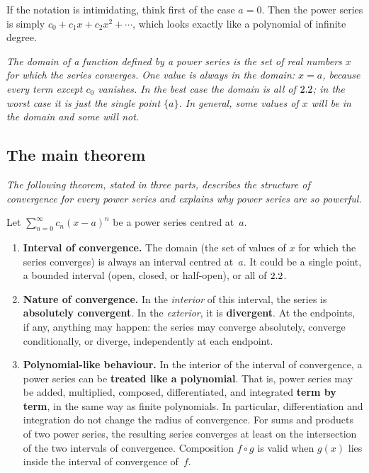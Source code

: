 \begin{remark}
If the notation is intimidating, think first of the case $a=0$.  Then the power series is simply $c_{0}+c_{1}x+c_{2}x^{2}+\cdots$, which looks exactly like a polynomial of infinite degree.
\end{remark}

\textit{The domain of a function defined by a power series is the set of real numbers $x$ for which the series converges.  One value is always in the domain: $x=a$, because every term except $c_{0}$ vanishes.  In the best case the domain is all of $2.2$; in the worst case it is just the single point $\{a\}$.  In general, some values of $x$ will be in the domain and some will not.}

\subsection*{The main theorem}

\textit{The following theorem, stated in three parts, describes the structure of convergence for every power series and explains why power series are so powerful.}

\begin{theorem}
\label{thm:14-1}
Let $\sum_{n=0}^{\infty}c_{n}(x-a)^{n}$ be a power series centred at~$a$.

\begin{enumerate}[label=(\roman*)]
  \item \textbf{Interval of convergence.}  The domain (the set of values of $x$ for which the series converges) is always an interval centred at~$a$.  It could be a single point, a bounded interval (open, closed, or half-open), or all of $2.2$.

  \item \textbf{Nature of convergence.}  In the \emph{interior} of this interval, the series is \textbf{absolutely convergent}.  In the \emph{exterior}, it is \textbf{divergent}.  At the endpoints, if any, anything may happen: the series may converge absolutely, converge conditionally, or diverge, independently at each endpoint.

  \item \textbf{Polynomial-like behaviour.}  In the interior of the interval of convergence, a power series can be \textbf{treated like a polynomial}.  That is, power series may be added, multiplied, composed, differentiated, and integrated \textbf{term by term}, in the same way as finite polynomials.  In particular, differentiation and integration do not change the radius of convergence.  For sums and products of two power series, the resulting series converges at least on the intersection of the two intervals of convergence.  Composition $f\circ g$ is valid when $g(x)$ lies inside the interval of convergence of~$f$.
\end{enumerate}
\end{theorem}

